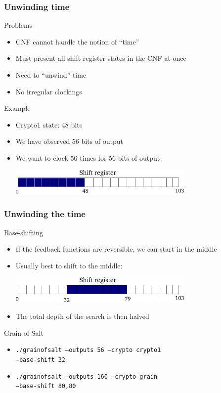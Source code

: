 \documentclass[xcolor=usenames,xcolor=svgnames,table,slidestop,compress,mathserif]{beamer}
\begin{document}
\frame
{\frametitle{Unwinding time}
\begin{beamerboxesrounded}[shadow=true]{Problems}
\begin{itemize}
 \item CNF cannot handle the notion of ``time''
 \item Must present all shift register states in the CNF at once
 \item Need to ``unwind'' time
 \item No irregular clockings
\end{itemize}
\end{beamerboxesrounded}

\bigskip

\begin{beamerboxesrounded}[shadow=true]{Example}
\begin{itemize}
 \item Crypto1 state: 48 bits
 \item We have observed 56 bits of output
 \item We want to clock 56 times for 56 bits of output
 
 \smallskip
 \includegraphics[width=9cm]{shifting/unwind}
\end{itemize}
\end{beamerboxesrounded}
}

\frame
{\frametitle{Unwinding the time}
\begin{beamerboxesrounded}[shadow=true]{Base-shifting}
\begin{itemize}
\item If the feedback functions are reversible, we can start in the middle
\item Usually best to shift to the middle:

\smallskip
\includegraphics[width=9cm]{shifting/shifting}

\item The total depth of the search is then halved
\end{itemize}
\end{beamerboxesrounded}

\bigskip

\begin{beamerboxesrounded}[shadow=true]{Grain of Salt}
\begin{itemize}
\item \texttt{./grainofsalt --outputs 56 --crypto crypto1\\
                            \qquad \qquad \qquad \quad --base-shift 32}
\item \texttt{./grainofsalt --outputs 160 --crypto grain\\
                            \qquad \qquad \qquad \quad --base-shift 80,80}
\end{itemize}
\end{beamerboxesrounded}
}
\end{document}
